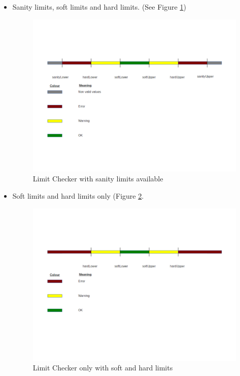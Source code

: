 \begin{itemize}
\item Sanity limits, soft limits and hard limits. (See Figure \ref{f4.2})
\begin{figure}[H]
\centerline{\includegraphics[width=1.2\textwidth]{images/LimitChecking1.png}}
\caption{Limit Checker with sanity limits available}
\label{f4.2}
\end{figure}
\pagebreak
\item Soft limits and hard limits only (Figure \ref{f4.3}.
\begin{figure}[H]
\centerline{\includegraphics[width=1.2\textwidth]{images/LimitChecking2.png}}
\caption{Limit Checker only with soft and hard limits}
\label{f4.3}
\end{figure}
\end{itemize}

